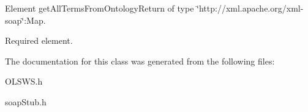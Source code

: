 Element getAllTermsFromOntologyReturn of type \char`\"{}http://xml.apache.org/xml-\/soap\char`\"{}:Map. 

Required element. 

The documentation for this class was generated from the following files:\begin{DoxyCompactItemize}
\item 
OLSWS.h\item 
soapStub.h\end{DoxyCompactItemize}
